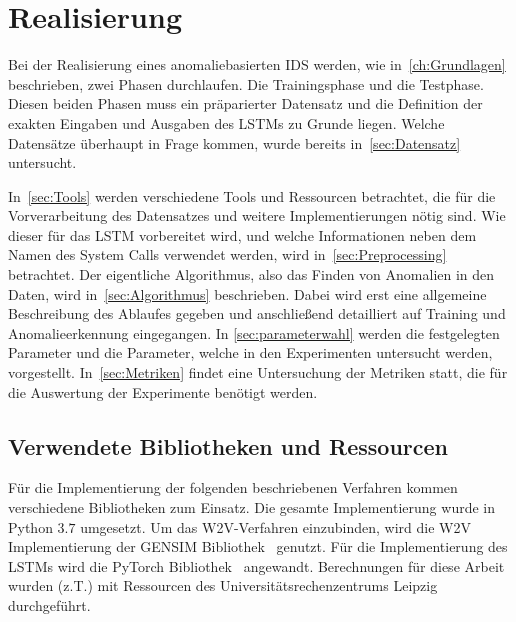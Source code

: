 \chapter{Realisierung}\label{ch:Realisierung}
    Bei der Realisierung eines anomaliebasierten \ac{IDS} werden, wie in~\autoref{ch:Grundlagen} beschrieben, zwei Phasen durchlaufen.
    Die Trainingsphase und die Testphase.
    Diesen beiden Phasen muss ein präparierter Datensatz und die Definition der exakten Eingaben und Ausgaben des \acp{LSTM} zu Grunde liegen. 
    Welche Datensätze überhaupt in Frage kommen, wurde bereits in~\autoref{sec:Datensatz} untersucht.\par\medskip

    In~\autoref{sec:Tools} werden verschiedene Tools und Ressourcen betrachtet, die für die Vorverarbeitung des Datensatzes und weitere Implementierungen nötig sind.
    Wie dieser für das \ac{LSTM} vorbereitet wird, und welche Informationen neben dem Namen des System Calls verwendet werden, wird in~\autoref{sec:Preprocessing} betrachtet. %
    Der eigentliche Algorithmus, also das Finden von Anomalien in den Daten, wird in~\autoref{sec:Algorithmus} beschrieben.
    Dabei wird erst eine allgemeine Beschreibung des Ablaufes gegeben und anschließend detailliert auf Training und Anomalieerkennung eingegangen.
    In \autoref{sec:parameterwahl} werden die festgelegten Parameter und die Parameter, welche in den Experimenten untersucht werden, vorgestellt.
    In~\autoref{sec:Metriken} findet eine Untersuchung der Metriken statt, die für die Auswertung der Experimente benötigt werden. 

    \section{Verwendete Bibliotheken und Ressourcen}\label{sec:Tools}
        Für die Implementierung der folgenden beschriebenen Verfahren kommen verschiedene Bibliotheken zum Einsatz.
        Die gesamte Implementierung wurde in Python $3.7$ umgesetzt.
        Um das \ac{W2V}-Verfahren einzubinden, wird die \ac{W2V} Implementierung der GENSIM Bibliothek~\cite{GENSIM} genutzt.
        Für die Implementierung des \acp{LSTM} wird die PyTorch Bibliothek~\cite{PYTORCH} angewandt. 
        Berechnungen für diese Arbeit wurden (z.T.) mit Ressourcen des Universitätsrechenzentrums Leipzig durchgeführt.

